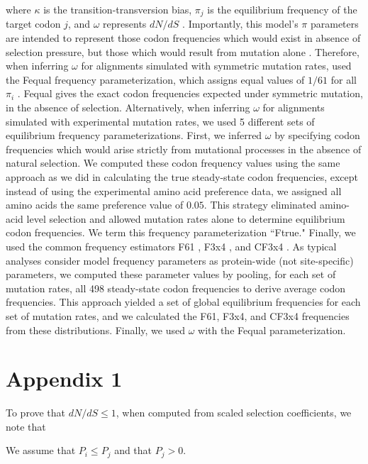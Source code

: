 \documentclass{pnastwo}
\newcommand{\xline}[0]{\noindent\underline{\makebox[0.15cm][l]{}}}
\begin{document}
\begin{article}
where $\kappa$ is the transition-transversion bias, $\pi_j$ is the equilibrium frequency of the target codon $j$, and $\omega$ represents $dN/dS$ \cite{GoldmanYang1994,NielsenYang1998}. Importantly, this model's $\pi$ parameters are intended to represent those codon frequencies which would exist in absence of selection pressure, but those which would result from mutation alone \cite{GoldmanYang1994,MuseGaut1994,YN00,Yang2006}. Therefore, when inferring $\omega$ for alignments simulated with symmetric mutation rates, used the F\xline equal frequency parameterization, which assigns equal values of $1/61$ for all $\pi_i$ \cite{Yang2006}. F\xline equal gives the exact codon frequencies expected under symmetric mutation, in the absence of selection. Alternatively, when inferring $\omega$ for alignments simulated with experimental mutation rates, we used 5 different sets of equilibrium frequency parameterizations. First, we inferred $\omega$ by specifying codon frequencies which would arise strictly from mutational processes in the absence of natural selection. We computed these codon frequency values using the same approach as we did in calculating the true steady-state codon frequencies, except instead of using the experimental amino acid preference data, we assigned all amino acids the same preference value of $0.05$. This strategy eliminated amino-acid level selection and allowed mutation rates alone to determine equilibrium codon frequencies. We term this frequency parameterization ``Ftrue." Finally, we used the common frequency estimators F61 \cite{GoldmanYang1994}, F3x4 \cite{MuseGaut1994}, and CF3x4 \cite{Pond2010}. As typical analyses consider model frequency parameters as protein-wide (not site-specific) parameters, we computed these parameter values by pooling, for each set of mutation rates, all 498 steady-state codon frequencies to derive average codon frequencies. This approach yielded a set of global equilibrium frequencies for each set of mutation rates, and we calculated the F61, F3x4, and CF3x4 frequencies from these distributions. Finally, we used $\omega$ with the F\xline equal parameterization.


\section*{Appendix 1}
To prove that $dN/dS \leq 1$, when computed from scaled selection coefficients, we note that 

We assume that $P_i \leq P_j$ and that $P_j > 0$.


\end{article}
\end{document}
